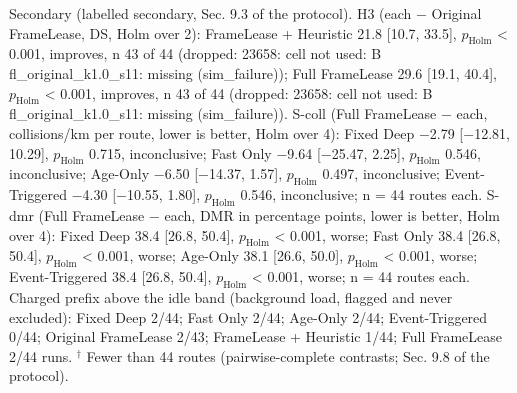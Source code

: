 \begin{table}[t]
{Secondary (labelled secondary, Sec. 9.3 of the protocol). H3 (each $-$ Original FrameLease, DS, Holm over 2): FrameLease + Heuristic 21.8 [10.7, 33.5], $p_\mathrm{Holm}$ \textless{} 0.001, improves, n 43 of 44 (dropped: 23658: cell not used: B fl\_original\_k1.0\_s11: missing (sim\_failure)); Full FrameLease 29.6 [19.1, 40.4], $p_\mathrm{Holm}$ \textless{} 0.001, improves, n 43 of 44 (dropped: 23658: cell not used: B fl\_original\_k1.0\_s11: missing (sim\_failure)). S-coll (Full FrameLease $-$ each, collisions/km per route, lower is better, Holm over 4): Fixed Deep $-$2.79 [$-$12.81, 10.29], $p_\mathrm{Holm}$ 0.715, inconclusive; Fast Only $-$9.64 [$-$25.47, 2.25], $p_\mathrm{Holm}$ 0.546, inconclusive; Age-Only $-$6.50 [$-$14.37, 1.57], $p_\mathrm{Holm}$ 0.497, inconclusive; Event-Triggered $-$4.30 [$-$10.55, 1.80], $p_\mathrm{Holm}$ 0.546, inconclusive; n = 44 routes each. S-dmr (Full FrameLease $-$ each, DMR in percentage points, lower is better, Holm over 4): Fixed Deep 38.4 [26.8, 50.4], $p_\mathrm{Holm}$ \textless{} 0.001, worse; Fast Only 38.4 [26.8, 50.4], $p_\mathrm{Holm}$ \textless{} 0.001, worse; Age-Only 38.1 [26.6, 50.0], $p_\mathrm{Holm}$ \textless{} 0.001, worse; Event-Triggered 38.4 [26.8, 50.4], $p_\mathrm{Holm}$ \textless{} 0.001, worse; n = 44 routes each. 
Charged prefix above the idle band (background load, flagged and never excluded): Fixed Deep 2/44; Fast Only 2/44; Age-Only 2/44; Event-Triggered 0/44; Original FrameLease 2/43; FrameLease + Heuristic 1/44; Full FrameLease 2/44 runs. 
$^\dagger$ Fewer than 44 routes (pairwise-complete contrasts; Sec. 9.8 of the protocol).
}
\end{table}
